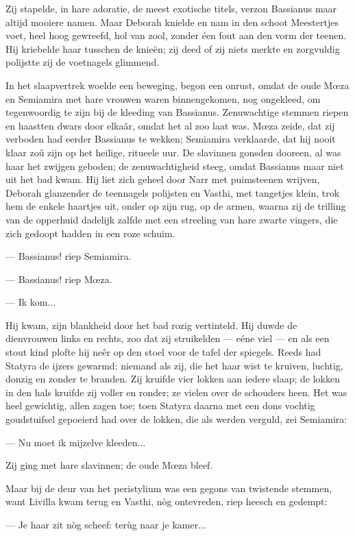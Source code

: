 \documentclass[a4paper, 12pt, oneside, dutch]{article}
\begin{document}
Zij stapelde, in hare adoratie, de meest exotische titels, verzon Bassianus maar altijd mooiere namen. Maar Deborah knielde en nam in den schoot Meestertjes voet, heel hoog gewreefd, hol van zool, zonder éen fout aan den vorm der teenen. Hij kriebelde haar tusschen de knieën; zij deed of zij niets merkte en zorgvuldig polijstte zij de voetnagels glimmend.

In het slaapvertrek woelde een beweging, begon een onrust, omdat de oude Mœza en Semiamira met hare vrouwen waren binnengekomen, nog ongekleed, om tegenwoordig te zijn bij de kleeding van Bassianus. Zenuwachtige stemmen riepen en haastten dwars door elkaâr, omdat het al zoo laat was. Mœza zeide, dat zij verboden had eerder Bassianus te wekken; Semiamira verklaarde, dat hij nooit klaar zoû zijn op het heilige, ritueele uur. De slavinnen gonsden dooreen, al was haar het zwijgen geboden; de zenuwachtigheid steeg, omdat Bassianus maar niet uit het bad kwam. Hij liet zich geheel door Narr met puimsteenen wrijven, Deborah glanzender de teennagels polijsten en Vasthi, met tangetjes klein, trok hem de enkele haartjes uit, onder op zijn rug, op de armen, waarna zij de trilling van de opperhuid dadelijk zalfde met een streeling van hare zwarte vingers, die zich gedoopt hadden in een roze schuim.

--- Bassianus! riep Semiamira.

--- Bassianus! riep Mœza.

--- Ik kom...

Hij kwam, zijn blankheid door het bad rozig vertinteld. Hij duwde de dienvrouwen links en rechts, zoo dat zij struikelden --- eéne viel --- en als een stout kind plofte hij neêr op den stoel voor de tafel der spiegels. Reeds had Statyra de ijzers gewarmd; niemand als zij, die het haar wist te kruiven, luchtig, donzig en zonder te branden. Zij kruifde vier lokken aan iedere slaap; de lokken in den hals kruifde zij voller en ronder; ze vielen over de schouders heen. Het was heel gewichtig, allen zagen toe; toen Statyra daarna met een dons vochtig goudstuifsel gepoeierd had over de lokken, die als werden verguld, zei Semiamira:

--- Nu moet ik mijzelve kleeden...

Zij ging met hare slavinnen; de oude Mœza bleef.

Maar bij de deur van het peristylium was een gegons van twistende stemmen, want Livilla kwam terug en Vasthi, nòg ontevreden, riep heesch en gedempt:

--- Je haar zit nòg scheef: terùg naar je kamer...
\end{document}
